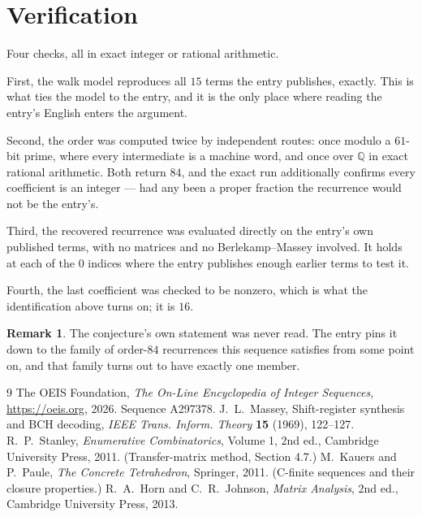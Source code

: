 \documentclass[11pt,a4paper]{article}
\theoremstyle{plain}
\theoremstyle{definition}
\newtheorem{remark}[theorem]{Remark}
\begin{document}
\section{Verification}

Four checks, all in exact integer or rational arithmetic.

First, the walk model reproduces all $15$ terms the entry publishes, exactly. This is
what ties the model to the entry, and it is the only place where reading the entry's English
enters the argument.

Second, the order was computed twice by independent routes: once modulo a $61$-bit prime, where
every intermediate is a machine word, and once over $\mathbb{Q}$ in exact rational arithmetic.
Both return $84$, and the exact run additionally confirms every coefficient is an integer
--- had any been a proper fraction the recurrence would not be the entry's.

Third, the recovered recurrence was evaluated directly on the entry's own published terms, with
no matrices and no Berlekamp--Massey involved. It holds at each of the $0$ indices where
the entry publishes enough earlier terms to test it.

Fourth, the last coefficient was checked to be nonzero, which is what the identification above
turns on; it is $16$.

\begin{remark}
The conjecture's own statement was never read. The entry pins it down to the family of
order-$84$ recurrences this sequence satisfies from some point on, and that family turns
out to have exactly one member.
\end{remark}

\begin{thebibliography}{9}
 The OEIS Foundation, \emph{The On-Line Encyclopedia of Integer
Sequences}, \url{https://oeis.org}, 2026. Sequence A297378.
 J.~L.~Massey, Shift-register synthesis and BCH decoding, \emph{IEEE
Trans. Inform. Theory} \textbf{15} (1969), 122--127.
 R.~P.~Stanley, \emph{Enumerative Combinatorics}, Volume 1, 2nd ed.,
Cambridge University Press, 2011. (Transfer-matrix method, Section 4.7.)
 M.~Kauers and P.~Paule, \emph{The Concrete Tetrahedron}, Springer, 2011.
(C-finite sequences and their closure properties.)
 R.~A.~Horn and C.~R.~Johnson, \emph{Matrix Analysis}, 2nd ed., Cambridge
University Press, 2013.
\end{thebibliography}
\end{document}
